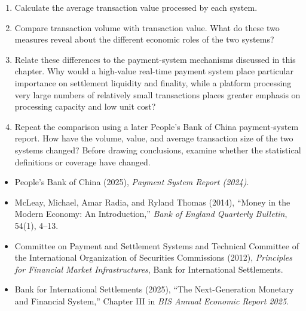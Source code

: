 \begin{enumerate}

\item Calculate the average transaction value processed by each system.

\item Compare transaction volume with transaction value. What do these
two measures reveal about the different economic roles of the two systems?

\item Relate these differences to the payment-system mechanisms discussed
in this chapter. Why would a high-value real-time payment system place
particular importance on settlement liquidity and finality, while a
platform processing very large numbers of relatively small transactions
places greater emphasis on processing capacity and low unit cost?

\item Repeat the comparison using a later People's Bank of China
payment-system report. How have the volume, value, and average transaction
size of the two systems changed? Before drawing conclusions, examine
whether the statistical definitions or coverage have changed.

\end{enumerate}


\begin{itemize}

\item People's Bank of China (2025), \emph{Payment System Report (2024)}.

\item McLeay, Michael, Amar Radia, and Ryland Thomas (2014),
``Money in the Modern Economy: An Introduction,''
\emph{Bank of England Quarterly Bulletin}, 54(1), 4--13.

\item Committee on Payment and Settlement Systems and
Technical Committee of the International Organization of Securities
Commissions (2012), \emph{Principles for Financial Market Infrastructures},
Bank for International Settlements.

\item Bank for International Settlements (2025),
``The Next-Generation Monetary and Financial System,''
Chapter III in \emph{BIS Annual Economic Report 2025}.

\end{itemize}


